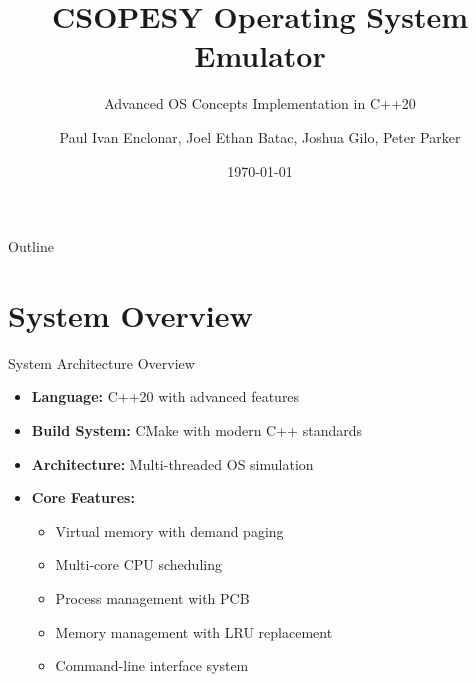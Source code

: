 \documentclass[10pt]{beamer}
\title[CSOPESY OS Emulator]{CSOPESY Operating System Emulator}
\subtitle{Advanced OS Concepts Implementation in C++20}
\author[PEGP Team]{Paul Ivan Enclonar, Joel Ethan Batac, Joshua Gilo, Peter Parker}
\institute[CSOPESY]{Computer Systems Organization and Programming}
\date{\today}
\begin{document}
\begin{frame}
    \titlepage
\end{frame}

\begin{frame}{Outline}
    \tableofcontents
\end{frame}

\section{System Overview}

\begin{frame}{System Architecture Overview}
    \begin{itemize}
        \item \textbf{Language:} C++20 with advanced features
        \item \textbf{Build System:} CMake with modern C++ standards
        \item \textbf{Architecture:} Multi-threaded OS simulation
        \item \textbf{Core Features:}
        \begin{itemize}
            \item Virtual memory with demand paging
            \item Multi-core CPU scheduling
            \item Process management with PCB
            \item Memory management with LRU replacement
            \item Command-line interface system
        \end{itemize}
    \end{itemize}
    
    \vspace{0.5cm}
    \begin{center}
    \end{center}
\end{frame}
\end{document}
